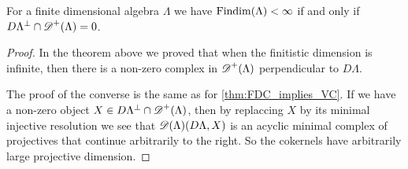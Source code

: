 \begin{theorem}\cite[Theorem~4.4]{Rick19}
	For a finite dimensional algebra $\Lambda$ we have $\operatorname{Findim}(\Lambda) < \infty$ if and only if $D\Lambda^\perp \cap \operatorname{\mathscr{D}}^+(\Lambda) = 0$.
	\begin{proof}
		In the theorem above we proved that when the finitistic dimension is infinite, then there is a non-zero complex in $\operatorname{\mathscr{D}}^+(\Lambda)$ perpendicular to $D\Lambda$. 
		
		The proof of the converse is the same as for \cref{thm:FDC_implies_VC}. If we have a non-zero object $X \in D\Lambda^\perp \cap \operatorname{\mathscr{D}}^+(\Lambda)$, then by replaccing $X$ by its minimal injective resolution we see that $\operatorname{\mathscr{D}}(\Lambda)(D\Lambda, X)$ is an acyclic minimal complex of projectives that continue arbitrarily to the right. So the cokernels have arbitrarily large projective dimension. 
	\end{proof}
\end{theorem}